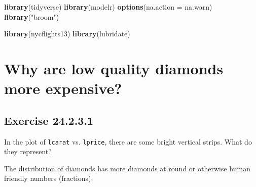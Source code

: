 \documentclass[]{book}
\newenvironment{Shaded}{\begin{snugshade}}{\end{snugshade}}
\newcommand{\DataTypeTok}[1]{\textcolor[rgb]{0.13,0.29,0.53}{#1}}
\newcommand{\FloatTok}[1]{\textcolor[rgb]{0.00,0.00,0.81}{#1}}
\newcommand{\KeywordTok}[1]{\textcolor[rgb]{0.13,0.29,0.53}{\textbf{#1}}}
\newcommand{\NormalTok}[1]{#1}
\newcommand{\OperatorTok}[1]{\textcolor[rgb]{0.81,0.36,0.00}{\textbf{#1}}}
\newcommand{\StringTok}[1]{\textcolor[rgb]{0.31,0.60,0.02}{#1}}
\theoremstyle{plain}
\theoremstyle{remark}
\begin{document}
\begin{Shaded}
\begin{Highlighting}[]
\KeywordTok{library}\NormalTok{(tidyverse)}
\KeywordTok{library}\NormalTok{(modelr)}
\KeywordTok{options}\NormalTok{(}\DataTypeTok{na.action =}\NormalTok{ na.warn)}
\KeywordTok{library}\NormalTok{(}\StringTok{"broom"}\NormalTok{)}

\KeywordTok{library}\NormalTok{(nycflights13)}
\KeywordTok{library}\NormalTok{(lubridate)}
\end{Highlighting}
\end{Shaded}

\hypertarget{why-are-low-quality-diamonds-more-expensive}{%
\section{Why are low quality diamonds more
expensive?}\label{why-are-low-quality-diamonds-more-expensive}}

\begin{Shaded}
\end{Shaded}

\hypertarget{exercise-24.2.3.1}{%
\subsection*{\texorpdfstring{Exercise
{24.2.3.1}}{Exercise 24.2.3.1}}\label{exercise-24.2.3.1}}

In the plot of \texttt{lcarat} vs. \texttt{lprice}, there are some
bright vertical strips. What do they represent?

The distribution of diamonds has more diamonds at round or otherwise
human friendly numbers (fractions).
\end{document}
